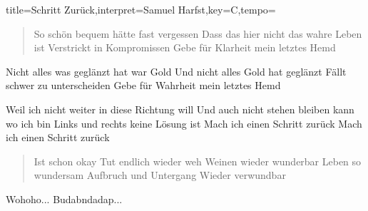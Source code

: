 \documentclass{leadsheet}
\begin{document}
\begin{song}{title={Schritt Zurück},interpret={Samuel Harfst},key={C},tempo={}}

\begin{schedule}
\end{schedule}

\begin{verse}
So schön bequem hätte fast vergessen
Dass das hier nicht das wahre Leben ist
Verstrickt in Kompromissen
Gebe für Klarheit mein letztes Hemd
\end{verse}

\begin{prechorus}
Nicht alles was geglänzt hat war Gold
Und nicht alles Gold hat geglänzt
Fällt schwer zu unterscheiden
Gebe für Wahrheit mein letztes Hemd
\end{prechorus}

\begin{chorus}
Weil ich nicht weiter in diese Richtung will
Und auch nicht stehen bleiben kann wo ich bin
Links und rechts keine Lösung ist
Mach ich einen Schritt zurück
Mach ich einen Schritt zurück
\end{chorus}

\begin{verse}
Ist schon okay
Tut endlich wieder weh
Weinen wieder wunderbar
Leben so wundersam
Aufbruch und Untergang
Wieder verwundbar
\end{verse}

\begin{bridge}
Wohoho...
Budabndadap...
\end{bridge}

\end{song}
\end{document}
